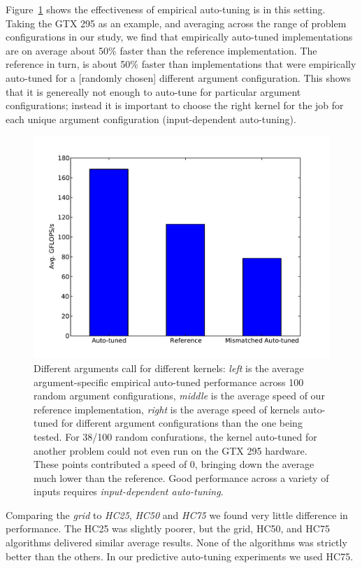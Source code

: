 \documentclass{sig-alternate}
\begin{document}
Figure~\ref{fig:allstars} shows the effectiveness of empirical auto-tuning is in this setting.
Taking the GTX 295 as an example,
and averaging across the range of problem configurations in our study,
we find that empirically auto-tuned implementations are on average about
50\% faster than the reference implementation.
The reference in turn, is about 50\% faster than implementations that were empirically auto-tuned for a [randomly chosen] different argument configuration.
This shows that it is genereally not enough to auto-tune for particular argument configurations;
instead it is important to choose the right kernel for the job for each unique argument configuration (input-dependent auto-tuning).
\begin{figure}
\centering
\includegraphics[scale=.42]{allstars_mixup_295.pdf}
\caption{Different arguments call for different kernels:
{\em left} is the average argument-specific empirical auto-tuned performance across 100 random argument configurations,
{\em middle} is the average speed of our reference implementation,
{\em right} is the average speed of kernels auto-tuned for different argument configurations than the one being tested.
For 38/100 random confurations, the kernel auto-tuned for another problem could not even run on the GTX 295 hardware.
These points contributed a speed of 0, bringing down the average much lower than the reference.
Good performance across a variety of inputs requires {\em input-dependent auto-tuning}.
}
\label{fig:allstars}
\end{figure}

Comparing the {\em grid} to {\em HC25}, {\em HC50} and {\em HC75} we found very little difference in performance.  The HC25 was slightly poorer, but the grid, HC50, and HC75 algorithms delivered similar average results. None of the algorithms was strictly better than the others.  In our predictive auto-tuning experiments we used HC75.
\end{document}
